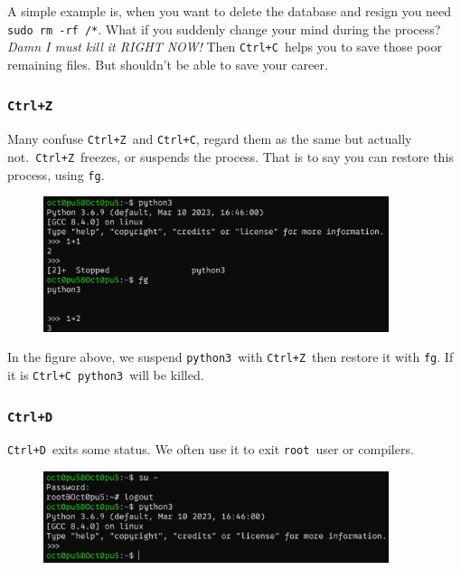 \documentclass[12pt]{ctexart}
\begin{document}
A simple example is, when you want to delete the database and resign you
need \texttt{sudo\ rm\ -rf\ /*}. What if you suddenly change your mind
during the process? \emph{Damn I must kill it RIGHT NOW!} Then
\texttt{Ctrl+C}\ helps you to save those poor remaining files. But
shouldn't be able to save your career.

\subsubsection*{\textbf{\texttt{Ctrl+Z}}}

Many confuse \texttt{Ctrl+Z}\ and \texttt{Ctrl+C}, regard them as the
same but actually not.\ \texttt{Ctrl+Z}\ freezes, or suspends the process.
That is to say you can restore this process, using \texttt{fg}.

\begin{figure}[H]
    \centering
    \includegraphics[width=0.9\textwidth,keepaspectratio]{assets/Linux/1.7 Tricks for a real Linuxer/6.png}
\end{figure}

In the figure above, we suspend \texttt{python3}\ with \texttt{Ctrl+Z}\
then restore it with \texttt{fg}. If it is \texttt{Ctrl+C}\
\texttt{python3}\ will be killed.

\subsubsection*{\textbf{\texttt{Ctrl+D}}}

\texttt{Ctrl+D}\ exits some status. We often use it to exit \texttt{root}\
user or compilers.

\begin{figure}[H]
    \centering
    \includegraphics[width=0.9\textwidth,keepaspectratio]{assets/Linux/1.7 Tricks for a real Linuxer/7.png}
\end{figure}
\end{document}

